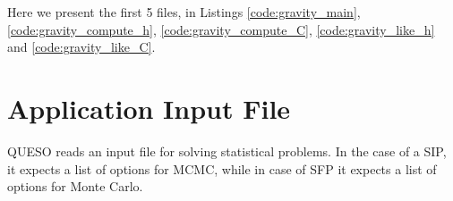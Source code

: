 Here we present the first 5 files, in Listings \ref{code:gravity_main}, \ref{code:gravity_compute_h}, \ref{code:gravity_compute_C}, \ref{code:gravity_like_h} and \ref{code:gravity_like_C}.


 








\section{Application Input File}\label{sec:application_input_file}

QUESO reads an input file for solving statistical problems.
In the case of a SIP, it expects a list of options for MCMC, while in case of SFP it expects a list of options for Monte Carlo.

